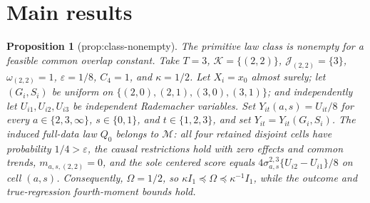 \documentclass{article}
\newtheorem{proposition}{Proposition}
\begin{document}
\section{Main results}

\begin{proposition}[prop:class-nonempty]\label{prop:class-nonempty}
The primitive law class is nonempty for a feasible common overlap constant. Take \(T=3\), \(\mathcal K=\{(2,2)\}\), \(\mathcal J_{(2,2)}=\{3\}\), \(\omega_{(2,2)}=1\), \(\varepsilon=1/8\), \(C_4=1\), and \(\kappa=1/2\). Let \(X_i=x_0\) almost surely; let \((G_i,S_i)\) be uniform on \(\{(2,0),(2,1),(3,0),(3,1)\}\); and independently let \(U_{i1},U_{i2},U_{i3}\) be independent Rademacher variables. Set \(Y_{it}(a,s)=U_{it}/8\) for every \(a\in\{2,3,\infty\}\), \(s\in\{0,1\}\), and \(t\in\{1,2,3\}\), and set \(Y_{it}=Y_{it}(G_i,S_i)\). The induced full-data law \(Q_0\) belongs to \(\mathcal M\): all four retained disjoint cells have probability \(1/4>\varepsilon\), the causal restrictions hold with zero effects and common trends, \(m_{a,s,(2,2)}=0\), and the sole centered score equals \(4\sigma_{a,s}^{2,3}\{U_{i2}-U_{i1}\}/8\) on cell \((a,s)\). Consequently, \(\Omega=1/2\), so \(\kappa I_1\preceq\Omega\preceq\kappa^{-1}I_1\), while the outcome and true-regression fourth-moment bounds hold.
\end{proposition}
\end{document}
